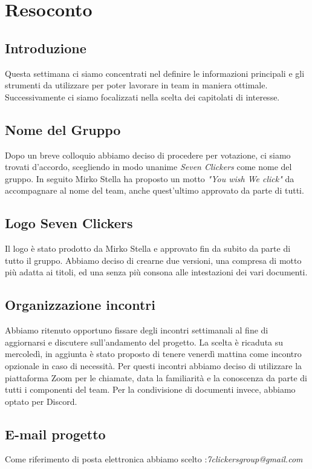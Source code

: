 \section{Resoconto}
\subsection{Introduzione}
Questa settimana ci siamo concentrati nel definire le informazioni principali e gli strumenti da utilizzare per poter lavorare in team in maniera ottimale. Successivamente ci siamo focalizzati nella scelta dei capitolati di interesse. 

\subsection{Nome del Gruppo}
Dopo un breve colloquio abbiamo deciso di procedere per votazione, ci siamo trovati d'accordo, scegliendo in modo unanime \textit{Seven Clickers} come nome del gruppo.  In seguito Mirko Stella ha proposto un motto \textit{"You wish We click"} da accompagnare al nome del team, anche quest'ultimo approvato da parte di tutti.

\subsection{Logo Seven Clickers}
Il logo è stato prodotto da Mirko Stella e approvato fin da subito da parte di tutto il gruppo.  Abbiamo deciso di crearne due versioni, una compresa di motto più adatta ai titoli, ed una senza più consona alle intestazioni dei vari documenti. 

\subsection{Organizzazione incontri}
Abbiamo ritenuto opportuno fissare degli incontri settimanali al fine di aggiornarsi e discutere sull'andamento del progetto. La scelta è ricaduta su mercoledì,  in aggiunta è stato proposto di tenere venerdì mattina come incontro opzionale in caso di necessità.  Per questi incontri abbiamo deciso di utilizzare la piattaforma Zoom per le chiamate, data la familiarità e la conoscenza da parte di tutti i componenti del team.  Per la condivisione di documenti invece,  abbiamo optato per Discord.

\subsection{E-mail progetto}
Come riferimento di posta elettronica abbiamo scelto :\textit{7clickersgroup@gmail.com}

